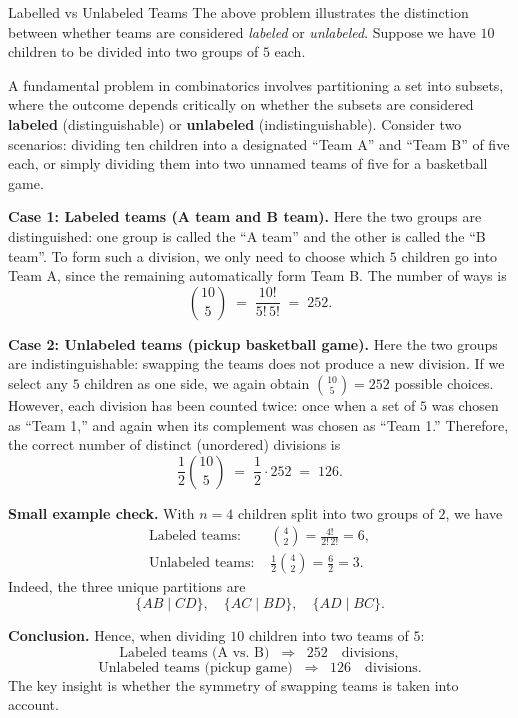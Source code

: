 \begin{keyconceptbox}{Labelled vs Unlabeled Teams}
The above problem illustrates the distinction between whether teams are considered \emph{labeled} or \emph{unlabeled}. Suppose we have $10$ children to be divided into two groups of $5$ each.

A fundamental problem in combinatorics involves partitioning a set into subsets, where the outcome depends critically on whether the subsets are considered \textbf{labeled} (distinguishable) or \textbf{unlabeled} (indistinguishable). Consider two scenarios: dividing ten children into a designated ``Team A'' and ``Team B'' of five each, or simply dividing them into two unnamed teams of five for a basketball game.

\medskip
\textbf{Case 1: Labeled teams (A team and B team).}  
Here the two groups are distinguished: one group is called the ``A team'' and the other is called the ``B team''. To form such a division, we only need to choose which $5$ children go into Team A, since the remaining automatically form Team B. The number of ways is
\begin{equation}
\binom{10}{5} \;=\; \frac{10!}{5!\,5!} \;=\; 252.
\end{equation}

\medskip
\textbf{Case 2: Unlabeled teams (pickup basketball game).}  
Here the two groups are indistinguishable: swapping the teams does not produce a new division. If we select any $5$ children as one side, we again obtain $\binom{10}{5} = 252$ possible choices. However, each division has been counted twice: once when a set of $5$ was chosen as ``Team 1,'' and again when its complement was chosen as ``Team 1.'' Therefore, the correct number of distinct (unordered) divisions is
\begin{equation}
\frac{1}{2}\binom{10}{5} \;=\; \frac{1}{2}\cdot 252 \;=\; 126.
\end{equation}

\medskip
\textbf{Small example check.}  
With $n=4$ children split into two groups of $2$, we have
\begin{align}
\text{Labeled teams: } & \binom{4}{2} = \frac{4!}{2!\,2!} = 6, \\
\text{Unlabeled teams: } & \frac{1}{2}\binom{4}{2} = \frac{6}{2} = 3.
\end{align}
Indeed, the three unique partitions are
\begin{equation}
\{AB \mid CD\}, \quad \{AC \mid BD\}, \quad \{AD \mid BC\}.
\end{equation}

\medskip
\textbf{Conclusion.}  
Hence, when dividing $10$ children into two teams of $5$:
\[
\text{Labeled teams (A vs. B)} \;\;\Rightarrow\;\; 252 \quad \text{divisions},
\]
\[
\text{Unlabeled teams (pickup game)} \;\;\Rightarrow\;\; 126 \quad \text{divisions}.
\]
The key insight is whether the symmetry of swapping teams is taken into account.

\end{keyconceptbox}


